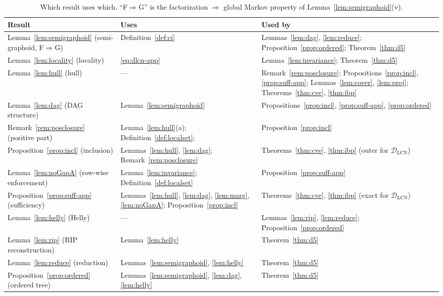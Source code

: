 \documentclass{article} %
\newcommand{\DLCN}{\mathcal{D}_{\mathrm{LCN}}}
\begin{document}
\begin{table}[h]
\centering
\small
\caption{Which result uses which. ``F$\Rightarrow$G'' is the factorization
$\Rightarrow$ global Markov property of Lemma~\ref{lem:semigraphoid}(v).}
\label{tab:deps}
\begin{tabularx}{\linewidth}{@{}l X X@{}}
\toprule
Result & Uses & Used by\\
\midrule
Lemma~\ref{lem:semigraphoid} (semi-graphoid, F$\Rightarrow$G) & Definition~\ref{def:ci} & Lemmas~\ref{lem:dag}, \ref{lem:reduce}; Proposition~\ref{prop:ordered}; Theorem~\ref{thm:d5}\\
Lemma~\ref{lem:locality} (locality) & \eqref{eq:dlcn-app} & Lemma~\ref{lem:invariance}; Theorem~\ref{thm:d5}\\
Lemma~\ref{lem:hull} (hull) & --- & Remark~\ref{rem:posclosure}; Propositions~\ref{prop:incl}, \ref{prop:suff-app}; Lemmas~\ref{lem:cover}, \ref{lem:proj}; Theorems~\ref{thm:cve}, \ref{thm:ibp}\\
Lemma~\ref{lem:dag} (DAG structure) & Lemma~\ref{lem:semigraphoid} & Propositions~\ref{prop:incl}, \ref{prop:suff-app}, \ref{prop:ordered}\\
Remark~\ref{rem:posclosure} (positive part) & Lemma~\ref{lem:hull}(a); Definition~\ref{def:localset}; \citet{cozman23a,cowell99} & Proposition~\ref{prop:incl}\\
Proposition~\ref{prop:incl} (inclusion) & Lemmas~\ref{lem:hull}, \ref{lem:dag}; Remark~\ref{rem:posclosure} & Theorems~\ref{thm:cve}, \ref{thm:ibp} (outer for $\DLCN$)\\
Lemma~\ref{lem:noGapA} (row-wise enforcement) & Lemma~\ref{lem:invariance}; Definition~\ref{def:localset} & Proposition~\ref{prop:suff-app}\\
Proposition~\ref{prop:suff-app} (sufficiency) & Lemmas~\ref{lem:hull}, \ref{lem:dag}, \ref{lem:marg}, \ref{lem:noGapA}; Proposition~\ref{prop:incl} & Theorems~\ref{thm:cve}, \ref{thm:ibp} (exact for $\DLCN$)\\
Lemma~\ref{lem:helly} (Helly) & --- & Lemmas~\ref{lem:rip}, \ref{lem:reduce}; Proposition~\ref{prop:ordered}\\
Lemma~\ref{lem:rip} (RIP reconstruction) & Lemma~\ref{lem:helly} & Theorem~\ref{thm:d5}\\
Lemma~\ref{lem:reduce} (reduction) & Lemmas~\ref{lem:semigraphoid}, \ref{lem:helly} & Theorem~\ref{thm:d5}\\
Proposition~\ref{prop:ordered} (ordered tree) & Lemmas~\ref{lem:semigraphoid}, \ref{lem:dag}, \ref{lem:helly} & Theorem~\ref{thm:d5}\\

\end{tabularx}
\end{table}
\end{document}

